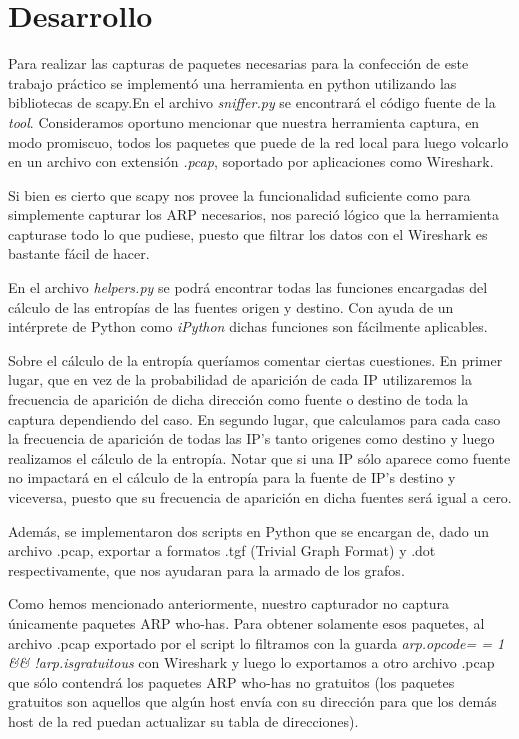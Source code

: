 \section{Desarrollo}

Para realizar las capturas de paquetes necesarias para la confección de este trabajo práctico se implementó una herramienta en python utilizando las bibliotecas de scapy.En el archivo \textit{sniffer.py} se encontrará el código fuente de la \textit{tool}. Consideramos oportuno mencionar que nuestra herramienta captura, en modo promiscuo, todos los paquetes que puede de la red local para luego volcarlo en un archivo con extensión \textit{.pcap}, soportado por aplicaciones como Wireshark.\newline

Si bien es cierto que scapy nos provee la funcionalidad suficiente como para simplemente capturar los ARP necesarios, nos pareció lógico que la herramienta capturase todo lo que pudiese, puesto que filtrar los datos con el Wireshark es bastante fácil de hacer.\newline

En el archivo \textit{helpers.py} se podrá encontrar todas las funciones encargadas del cálculo de las entropías de las fuentes origen y destino. Con ayuda de un intérprete de Python como \textit{iPython} dichas funciones son fácilmente aplicables.\newline

Sobre el cálculo de la entropía queríamos comentar ciertas cuestiones. En primer lugar, que en vez de la probabilidad de aparición de cada IP utilizaremos la frecuencia de aparición de dicha dirección como fuente o destino de toda la captura dependiendo del caso. En segundo lugar, que calculamos para cada caso la frecuencia de aparición de todas las IP's tanto origenes como destino y luego realizamos el cálculo de la entropía. Notar que si una IP sólo aparece como fuente no impactará en el cálculo de la entropía para la fuente de IP's destino y viceversa, puesto que su frecuencia de aparición en dicha fuentes será igual a cero.\newline

Además, se implementaron dos scripts en Python que se encargan de, dado un archivo .pcap, exportar a formatos .tgf (Trivial Graph Format) y .dot respectivamente, que nos ayudaran para la armado de los grafos.\newline

Como hemos mencionado anteriormente, nuestro capturador no captura únicamente paquetes ARP who-has. Para obtener solamente esos paquetes, al archivo .pcap exportado por el script lo filtramos con la guarda \textit {arp.opcode= = 1 \&\&  !arp.isgratuitous} con Wireshark y luego lo exportamos a otro archivo .pcap que sólo contendrá los paquetes ARP who-has no gratuitos (los paquetes gratuitos son aquellos que algún host envía con su dirección para que los demás host de la red puedan actualizar su tabla de direcciones).\newline
